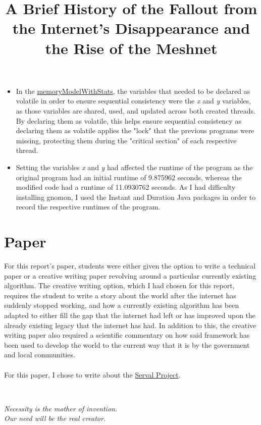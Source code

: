 \documentclass{article}
\theoremstyle{theorem}
\theoremstyle{definition}
\theoremstyle{remark}
\begin{document}
\begin{itemize}
    \item In the \href{https://www.online-java.com/yFkZ4HqfRG}{memoryModelWithStats}, the variables that needed to be declared as volatile in order to ensure sequential consistency were the \textit{x} and \textit{y} variables, as those variables are shared, used, and updated across both created threads. By declaring them as volatile, this helps ensure sequential consistency as declaring them as volatile applies the "lock" that the previous programs were missing, protecting them during the "critical section" of each respective thread.
    \item Setting the variables \textit{x} and \textit{y} had affected the runtime of the program as the original program had an initial runtime of 9.875962 seconds, whereas the modified code had a runtime of 11.0930762 seconds. As I had difficulty installing gnomon, I used the Instant and Duration Java packages in order to record the respective runtimes of the program.
\end{itemize}
\section{Paper}
For this report’s paper, students were either given the option to write a technical paper or a creative writing paper revolving around a particular currently existing algorithm. The creative writing option, which I had chosen for this report, requires the student to write a story about the world after the internet has suddenly stopped working, and how a currently existing algorithm has been adapted to either fill the gap that the internet had left or has improved upon the already existing legacy that the internet has had. In addition to this, the creative writing paper also required a scientific commentary on how said framework has been used to develop the world to the current way that it is by the government and local communities. \\
\\ For this paper, I chose to write about the \href{https://en.wikipedia.org/wiki/Serval_Project}{Serval Project}. \\
\begin{center}
    \title{\textbf{A Brief History of the Fallout from the Internet's Disappearance and the Rise of the Meshnet}} \\
\end{center}

\begin{center}
    \textit{Necessity is the mother of invention.} \\
    \textit{Our need will be the real creator.} \\
\end{center}
\end{document}
